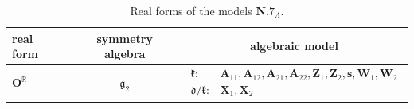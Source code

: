 \documentclass[10pt,a4paper]{amsart}
\newcommand{\bbR}{\mathbb{R}}
\newcommand{\mbA}{\mathbf{A}}
\newcommand{\mbO}{\mathbf{O}}
\newcommand{\mbs}{\mathbf{s}}
\newcommand{\mbW}{\mathbf{W}}
\newcommand{\mbX}{\mathbf{X}}
\newcommand{\mbZ}{\mathbf{Z}}
\newcommand{\mfd} {\mathfrak{d}}
\newcommand{\mfg} {\mathfrak{g}}
\newcommand{\mfk} {\mathfrak{k}}
\numberwithin{equation}{section}
\begin{document}
\begin{table}[h!]
\caption{The real form $\mbO^{\bbR}$ of model $\mbO$.}\label{table:real-O}\vspace{1mm}

\tiny
\centering
\begin{tabular}{lcl}
\toprule
 real form
 & symmetry algebra
 & \multicolumn{1}{c}{algebraic model} \\
\midrule
 $\mbO^{\bbR}$
 & $\mfg_2$
 & $\begin{array}{rl}
 \mfk\colon
 &\!\!\!\!\!\! \mbA_{11}, \mbA_{12}, \mbA_{21}, \mbA_{22}, \mbZ_1, \mbZ_2, \mbs, \mbW_1, \mbW_2 \\
	 \mfd / \mfk\colon
 &\!\!\!\!\!\! \mbX_1, \mbX_2
 \end{array}$ \\
\bottomrule
\end{tabular}

\vspace{0.8cm}

\caption{Real forms of the models $\mathbf{N.7}_{\Lambda}$.}\label{table:real-N.7}\vspace{1mm}


\end{table}
\end{document}
